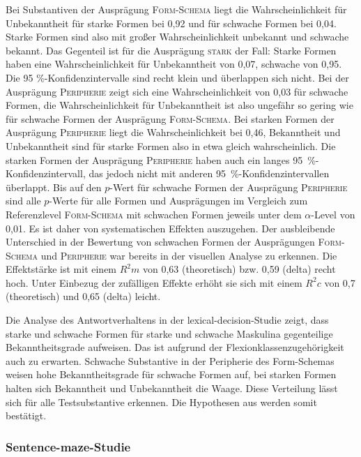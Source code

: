 Bei Substantiven der Ausprägung \textsc{Form-Schema} liegt die Wahrscheinlichkeit für Unbekanntheit für starke Formen bei 0,92 und für schwache Formen bei 0,04. Starke Formen sind also mit großer Wahrscheinlichkeit unbekannt und schwache bekannt. Das Gegenteil ist für die Ausprägung \textsc{stark} der Fall: Starke Formen haben eine Wahrscheinlichkeit für Unbekanntheit von 0,07, schwache von 0,95. Die 95 \%-Konfidenzintervalle sind recht klein und überlappen sich nicht. Bei der Ausprägung \textsc{Peripherie} zeigt sich eine Wahrscheinlichkeit von 0,03 für schwache Formen, die Wahrscheinlichkeit für Unbekanntheit ist also ungefähr so gering wie für schwache Formen der Ausprägung \textsc{Form-Schema}. Bei starken Formen der Ausprägung \textsc{Peripherie} liegt die Wahrscheinlichkeit bei 0,46, Bekanntheit und Unbekanntheit sind für starke Formen also in etwa gleich wahrscheinlich. Die starken Formen der Ausprägung \textsc{Peripherie} haben auch ein langes 95~\%-Konfidenzintervall, das jedoch nicht mit anderen 95~\%-Konfidenzintervallen überlappt. Bis auf den $p$-Wert für schwache Formen der Ausprägung \textsc{Peripherie} sind alle $p$-Werte für alle Formen und Ausprägungen im Vergleich zum Referenzlevel \textsc{Form-Schema} mit schwachen Formen jeweils unter dem $\alpha$-Level von 0,01. Es ist daher von systematischen Effekten auszugehen. Der ausbleibende Unterschied in der Bewertung von schwachen Formen der Ausprägungen \textsc{Form-Schema} und \textsc{Peripherie} war bereits in der visuellen Analyse zu erkennen. Die Effektstärke ist mit einem $R^2m$ von 0,63 (theoretisch) bzw. 0,59 (delta) recht hoch. Unter Einbezug der zufälligen Effekte erhöht sie sich mit einem $R^2c$ von 0,7 (theoretisch) und 0,65 (delta) leicht.

Die Analyse des Antwortverhaltens in der lexical-decision-Studie zeigt, dass starke und schwache Formen für starke und schwache Maskulina gegenteilige Bekanntheitsgrade aufweisen. Das ist aufgrund der Flexionklassenzugehörigkeit auch zu erwarten. Schwache Substantive in der Peripherie des Form-Schemas weisen hohe Bekanntheitsgrade für schwache Formen auf, bei starken Formen halten sich Bekanntheit und Unbekanntheit die Waage. Diese Verteilung lässt sich für alle Testsubstantive erkennen. Die Hypothesen aus  werden somit bestätigt.


\subsubsection{Sentence-maze-Studie}

